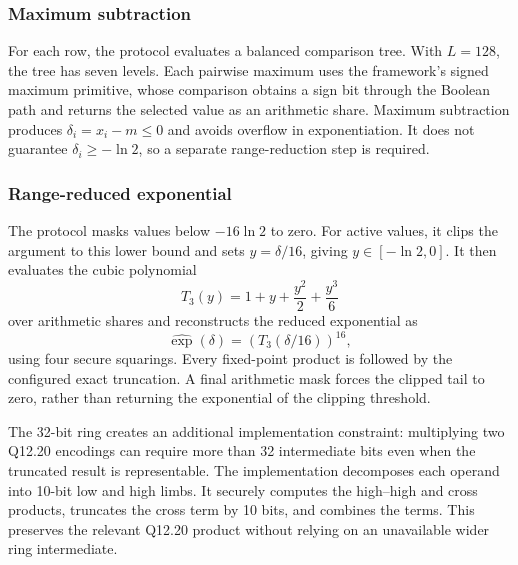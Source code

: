 \subsubsection{Maximum subtraction}
For each row, the protocol evaluates a balanced comparison tree. With $L=128$, the tree has seven levels. Each pairwise maximum uses the framework's signed maximum primitive, whose comparison obtains a sign bit through the Boolean path and returns the selected value as an arithmetic share. Maximum subtraction produces $\delta_i=x_i-m\leq0$ and avoids overflow in exponentiation. It does not guarantee $\delta_i\geq-\ln 2$, so a separate range-reduction step is required.

\subsubsection{Range-reduced exponential}
The protocol masks values below $-16\ln 2$ to zero. For active values, it clips the argument to this lower bound and sets $y=\delta/16$, giving $y\in[-\ln 2,0]$. It then evaluates the cubic polynomial
\begin{equation}
    T_3(y)=1+y+\frac{y^2}{2}+\frac{y^3}{6}
    \label{eq:taylor}
\end{equation}
over arithmetic shares and reconstructs the reduced exponential as
\begin{equation}
    \widehat{\exp}(\delta)=\left(T_3(\delta/16)\right)^{16},
    \label{eq:range-reduction}
\end{equation}
using four secure squarings. Every fixed-point product is followed by the configured exact truncation. A final arithmetic mask forces the clipped tail to zero, rather than returning the exponential of the clipping threshold.

The 32-bit ring creates an additional implementation constraint: multiplying two Q12.20 encodings can require more than 32 intermediate bits even when the truncated result is representable. The implementation decomposes each operand into 10-bit low and high limbs. It securely computes the high--high and cross products, truncates the cross term by 10 bits, and combines the terms. This preserves the relevant Q12.20 product without relying on an unavailable wider ring intermediate.


